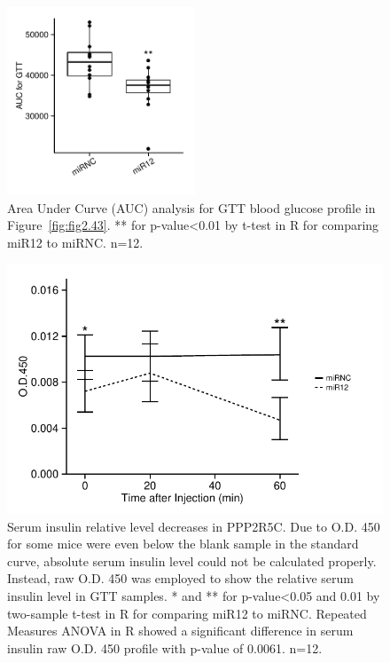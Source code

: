 \begin{figure}
\centering
\includegraphics[width=0.5\textwidth]{figs/fig2-44 AUC for gtt.pdf}
\caption[AUC analysis for GTT results]{\footnotesize Area Under Curve (AUC) analysis for GTT blood glucose profile in Figure~\ref{fig:fig2.43}. ** for p-value<0.01 by t-test in R for comparing miR12 to miRNC. n=12.}
\label{fig:fig2.44}
\end{figure}


\begin{figure}[htbp]
\centering
\includegraphics[width=1\textwidth]{figs/fig2-45 serum ins for gtt.pdf}
\caption[Serum insulin level in GTT]{\footnotesize Serum insulin relative level decreases in PPP2R5C. Due to O.D. 450 for some mice were even below the blank sample in the standard curve, absolute serum insulin level could not be calculated properly. Instead, raw O.D. 450 was employed to show the relative serum insulin level in GTT samples. * and ** for p-value<0.05 and 0.01 by two-sample t-test in R for comparing miR12 to miRNC. Repeated Measures \gls{ANOVA} in R showed a significant difference in serum insulin raw O.D. 450 profile with p-value of 0.0061. n=12.}
\label{fig:fig2.45}
\end{figure}


